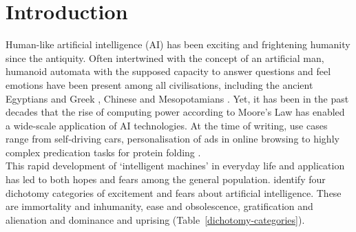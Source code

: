\section{Introduction}

Human-like artificial intelligence (AI) has been exciting and frightening humanity since the antiquity.
Often intertwined with the concept of an artificial man, humanoid automata with the supposed capacity to answer questions and feel emotions have been present among all civilisations, including the ancient Egyptians and Greek \citep{Newquist1994}, Chinese \citep{cohen1986} and Mesopotamians \citep{unat2008}.
Yet, it has been in the past decades that the rise of computing power according to Moore’s Law has enabled a wide-scale application of AI technologies.
At the time of writing, use cases range from self-driving cars, personalisation of ads in online browsing to highly complex predication tasks for protein folding \citep{jumper2021}.
\\
This rapid development of ‘intelligent machines’ in everyday life and application has led to both hopes and fears among the general population.
\citet{cave2019} identify four dichotomy categories of excitement and fears about artificial intelligence.
These are immortality and inhumanity, ease and obsolescence, gratification and alienation and dominance and uprising (Table~\ref{dichotomy-categories}).


